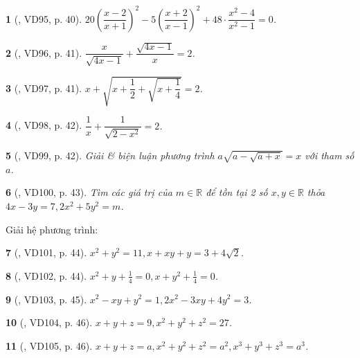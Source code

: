 \documentclass{article}
\newtheorem{baitoan}{}
\begin{document}
\begin{baitoan}[\cite{Binh_Toan_9_tap_2}, VD95, p. 40]
	$20\left(\dfrac{x - 2}{x + 1}\right)^2 - 5\left(\dfrac{x + 2}{x - 1}\right)^2 + 48\cdot\dfrac{x^2 - 4}{x^2 - 1} = 0$.
\end{baitoan}

\begin{baitoan}[\cite{Binh_Toan_9_tap_2}, VD96, p. 41]
	$\dfrac{x}{\sqrt{4x - 1}} + \dfrac{\sqrt{4x - 1}}{x} = 2$.
\end{baitoan}

\begin{baitoan}[\cite{Binh_Toan_9_tap_2}, VD97, p. 41]
	$x + \sqrt{x + \dfrac{1}{2} + \sqrt{x + \dfrac{1}{4}}} = 2$.
\end{baitoan}

\begin{baitoan}[\cite{Binh_Toan_9_tap_2}, VD98, p. 42]
	$\dfrac{1}{x} + \dfrac{1}{\sqrt{2 - x^2}} = 2$.
\end{baitoan}

\begin{baitoan}[\cite{Binh_Toan_9_tap_2}, VD99, p. 42]
	Giải \& biện luận phương trình $a\sqrt{a - \sqrt{a + x}} = x$ với tham số $a$.
\end{baitoan}

\begin{baitoan}[\cite{Binh_Toan_9_tap_2}, VD100, p. 43]
	Tìm các giá trị của $m\in\mathbb{R}$ để tồn tại 2 số $x,y\in\mathbb{R}$ thỏa $4x - 3y = 7,2x^2 + 5y^2 = m$.
\end{baitoan}
Giải hệ phương trình:

\begin{baitoan}[\cite{Binh_Toan_9_tap_2}, VD101, p. 44]	
	$x^2 + y^2 = 11,x + xy + y = 3 + 4\sqrt{2}$.
\end{baitoan}

\begin{baitoan}[\cite{Binh_Toan_9_tap_2}, VD102, p. 44]
	$x^2 + y + \frac{1}{4} = 0,x + y^2 + \frac{1}{4} = 0$.
\end{baitoan}

\begin{baitoan}[\cite{Binh_Toan_9_tap_2}, VD103, p. 45]
	$x^2 - xy + y^2 = 1,2x^2 - 3xy + 4y^2 = 3$.
\end{baitoan}

\begin{baitoan}[\cite{Binh_Toan_9_tap_2}, VD104, p. 46]
	$x + y + z = 9,x^2 + y^2 + z^2 = 27$.
\end{baitoan}

\begin{baitoan}[\cite{Binh_Toan_9_tap_2}, VD105, p. 46]
	$x + y + z = a,x^2 + y^2 + z^2 = a^2,x^3 + y^3 + z^3 = a^3$.
\end{baitoan}
\end{document}
